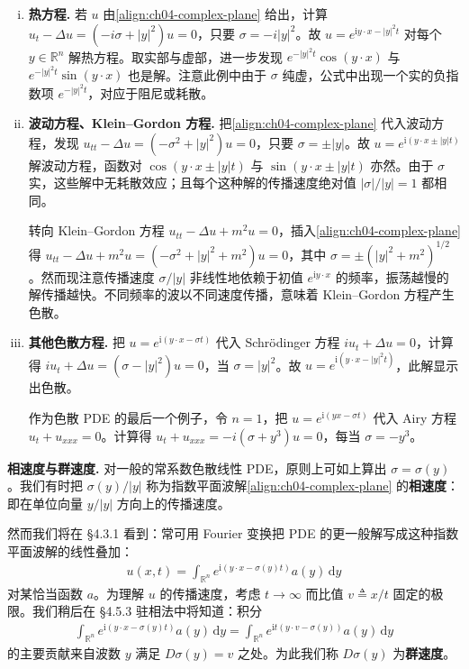 \documentclass[../../main.tex]{subfiles}
\begin{document}
\begin{enumerate}[(i)]
\item \textbf{热方程.} 若 $u$ 由\eqref{align:ch04-complex-plane} 给出，计算 $u_t-\Delta u=(-i\sigma+|y|^2)u=0$，只要 $\sigma=-i|y|^2$。故 $u=e^{\mathrm{i}y\cdot x-|y|^2 t}$ 对每个 $y\in\mathbb{R}^n$ 解热方程。取实部与虚部，进一步发现 $e^{-|y|^2 t}\cos(y\cdot x)$ 与 $e^{-|y|^2 t}\sin(y\cdot x)$ 也是解。注意此例中由于 $\sigma$ 纯虚，公式中出现一个实的负指数项 $e^{-|y|^2 t}$，对应于阻尼或耗散。

\item \textbf{波动方程、Klein--Gordon 方程.} 把\eqref{align:ch04-complex-plane} 代入波动方程，发现 $u_{tt}-\Delta u=(-\sigma^2+|y|^2)u=0$，只要 $\sigma=\pm|y|$。故 $u=e^{\mathrm{i}(y\cdot x\pm|y|t)}$ 解波动方程，函数对 $\cos(y\cdot x\pm|y|t)$ 与 $\sin(y\cdot x\pm|y|t)$ 亦然。由于 $\sigma$ 实，这些解中无耗散效应；且每个这种解的传播速度绝对值 $|\sigma|/|y|=1$ 都相同。

转向 Klein--Gordon 方程 $u_{tt}-\Delta u+m^2u=0$，插入\eqref{align:ch04-complex-plane} 得 $u_{tt}-\Delta u+m^2u=(-\sigma^2+|y|^2+m^2)u=0$，其中 $\sigma=\pm(|y|^2+m^2)^{1/2}$。然而现注意传播速度 $\sigma/|y|$ 非线性地依赖于初值 $e^{\mathrm{i}y\cdot x}$ 的频率，振荡越慢的解传播越快。不同频率的波以不同速度传播，意味着 Klein--Gordon 方程产生色散。

\item \textbf{其他色散方程.} 把 $u=e^{\mathrm{i}(y\cdot x-\sigma t)}$ 代入 Schrödinger 方程 $iu_t+\Delta u=0$，计算得 $iu_t+\Delta u=(\sigma-|y|^2)u=0$，当 $\sigma=|y|^2$。故 $u=e^{\mathrm{i}(y\cdot x-|y|^2 t)}$，此解显示出色散。

作为色散 PDE 的最后一个例子，令 $n=1$，把 $u=e^{\mathrm{i}(yx-\sigma t)}$ 代入 Airy 方程 $u_t+u_{xxx}=0$。计算得 $u_t+u_{xxx}=-i(\sigma+y^3)u=0$，每当 $\sigma=-y^3$。
\end{enumerate}
\textbf{相速度与群速度.} 对一般的常系数色散线性 PDE，原则上可如上算出 $\sigma=\sigma(y)$。我们有时把 $\sigma(y)/|y|$ 称为指数平面波解\eqref{align:ch04-complex-plane} 的\textbf{相速度}：即在单位向量 $y/|y|$ 方向上的传播速度。

然而我们将在 \S4.3.1 看到：常可用 Fourier 变换把 PDE 的更一般解写成这种指数平面波解的线性叠加：
\begin{align*}
u(x,t)=\int_{\mathbb{R}^n} e^{\mathrm{i}(y\cdot x-\sigma(y)t)}a(y)\,\mathrm{d}y
\end{align*}
对某恰当函数 $a$。为理解 $u$ 的传播速度，考虑 $t\to\infty$ 而比值 $v\triangleq x/t$ 固定的极限。我们稍后在 \S4.5.3 驻相法中将知道：积分
\begin{align*}
\int_{\mathbb{R}^n} e^{\mathrm{i}(y\cdot x-\sigma(y)t)}a(y)\,\mathrm{d}y=\int_{\mathbb{R}^n}e^{\mathrm{i}t(y\cdot v-\sigma(y))}a(y)\,\mathrm{d}y
\end{align*}
的主要贡献来自波数 $y$ 满足 $D\sigma(y)=v$ 之处。为此我们称 $D\sigma(y)$ 为\textbf{群速度}。
\end{document}

